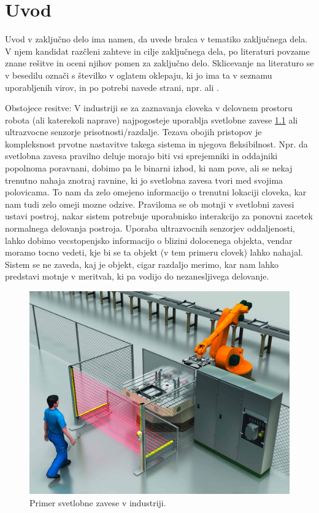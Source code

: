 \documentclass[a4paper,twoside,openright,12pt,slovene]{book}
\begin{document}
\mainmatter

\chapter{Uvod} \label{uvod}

Uvod v zaključno delo ima namen, da uvede bralca v tematiko zaključnega dela. V njem kandidat razčleni zahteve in cilje zaključnega dela, po literaturi povzame znane rešitve in oceni njihov pomen za zaključno delo. Sklicevanje na literaturo se v besedilu označi s številko v oglatem oklepaju, ki jo ima ta v seznamu uporabljenih virov, in po potrebi navede strani, npr. \cite{miklavcic2010objavljanje} ali \cite[stran 520-534]{juznic1992diplomska}.

Obstojece resitve:
V industriji se za zaznavanja cloveka v delovnem prostoru robota (ali katerekoli naprave) najpogosteje uporablja svetlobne zavese \ref{svetlobna_zavesa} ali ultrazvocne senzorje prisotnosti/razdalje. Tezava obojih pristopov je kompleksnost prvotne nastavitve takega sistema in njegova fleksibilnost. Npr. da svetlobna zavesa pravilno deluje morajo biti vsi sprejemniki in oddajniki popolnoma poravnani, dobimo pa le binarni izhod, ki nam pove, ali se nekaj trenutno nahaja znotraj ravnine, ki jo svetlobna zavesa tvori med svojima polovicama. To nam da zelo omejeno informacijo o trenutni lokaciji cloveka, kar nam tudi zelo omeji mozne odzive. Praviloma se ob motnji v svetlobni zavesi ustavi postroj, nakar sistem potrebuje uporabnisko interakcijo za ponovni zacetek normalnega delovanja postroja. Uporaba ultrazvocnih senzorjev oddaljenosti, lahko dobimo vecstopenjsko informacijo o blizini dolocenega objekta, vendar moramo tocno vedeti, kje bi se ta objekt (v tem primeru clovek) lahko nahajal. Sistem se ne zaveda, kaj je objekt, cigar razdaljo merimo, kar nam lahko predstavi motnje v meritvah, ki pa vodijo do nezanesljivega delovanje.

\begin{figure}[h]
    \centering
    \includegraphics[width=0.75\columnwidth]{Slike/light-curtain-application.jpg}
    \caption{\label{svetlobna_zavesa} Primer svetlobne zavese v industriji.}
\end{figure}
\end{document}
